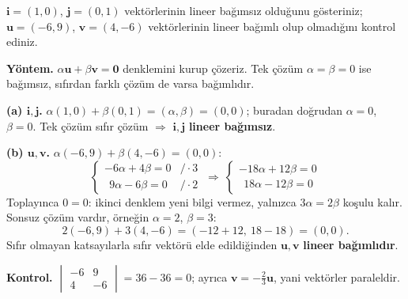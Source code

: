 \begin{soru}
$\mathbf i=(1,0)$, $\mathbf j=(0,1)$ vektörlerinin lineer bağımsız olduğunu gösteriniz; $\mathbf u=(-6,9)$, $\mathbf v=(4,-6)$ vektörlerinin lineer bağımlı olup olmadığını kontrol ediniz.
\end{soru}
\begin{cevap}
\textbf{Yöntem.} $\alpha\mathbf u+\beta\mathbf v=\mathbf 0$ denklemini kurup çözeriz. Tek çözüm $\alpha=\beta=0$ ise bağımsız, sıfırdan farklı çözüm de varsa bağımlıdır.

\textbf{(a) $\mathbf i,\mathbf j$.} $\alpha(1,0)+\beta(0,1)=(\alpha,\beta)=(0,0)$; buradan doğrudan $\alpha=0$, $\beta=0$. Tek çözüm sıfır çözüm $\Rightarrow$ $\mathbf i,\mathbf j$ \textbf{lineer bağımsız}.

\textbf{(b) $\mathbf u,\mathbf v$.} $\alpha(-6,9)+\beta(4,-6)=(0,0)$:
\[
\begin{cases}-6\alpha+4\beta=0 & /\cdot 3\\ \ \ 9\alpha-6\beta=0 & /\cdot 2\end{cases}
\ \Rightarrow\
\begin{cases}-18\alpha+12\beta=0\\ \ \ 18\alpha-12\beta=0\end{cases}
\]
Toplayınca $0=0$: ikinci denklem yeni bilgi vermez, yalnızca $3\alpha=2\beta$ koşulu kalır. Sonsuz çözüm vardır, örneğin $\alpha=2$, $\beta=3$:
\[
2(-6,9)+3(4,-6)=(-12+12,\ 18-18)=(0,0).
\]
Sıfır olmayan katsayılarla sıfır vektörü elde edildiğinden $\mathbf u,\mathbf v$ \textbf{lineer bağımlıdır}.

\textbf{Kontrol.} $\begin{vmatrix}-6&9\\4&-6\end{vmatrix}=36-36=0$; ayrıca $\mathbf v=-\frac23\mathbf u$, yani vektörler paraleldir.
\end{cevap}


